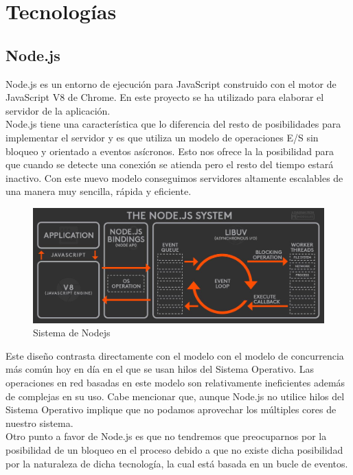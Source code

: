 \chapter{Tecnologías}

\section{Node.js}

Node.js es un entorno de ejecución para JavaScript construido con el motor de JavaScript
V8 de Chrome. En este proyecto se ha utilizado para elaborar el servidor de la aplicación.\\

Node.js tiene una característica que lo diferencia del resto de posibilidades para implementar 
el servidor y es que utiliza un modelo de operaciones E/S sin bloqueo y orientado a eventos 
asícronos. Esto nos ofrece la la posibilidad para que cuando se detecte una conexión se atienda
pero el resto del tiempo estará inactivo. Con este nuevo modelo conseguimos servidores altamente 
escalables de una manera muy sencilla, rápida y eficiente.\\

\begin{figure}[H]
	\centering
	\includegraphics[scale=0.25]{imagenes/nodejs_system.jpg}
	\caption{Sistema de Nodejs \label{fig:figura1}}
\end{figure}

Este diseño contrasta directamente con el modelo con el modelo de concurrencia más común hoy en 
día en el que se usan hilos del Sistema Operativo. Las operaciones en red basadas en este modelo
son relativamente ineficientes además de complejas en su uso. Cabe mencionar que, aunque Node.js 
no utilice hilos del Sistema Operativo implique que no podamos aprovechar los múltiples cores
de nuestro sistema.\\

Otro punto a favor de Node.js es que no tendremos que preocuparnos por la posibilidad de un 
bloqueo en el proceso debido a que no existe dicha posibilidad por la naturaleza de dicha 
tecnología, la cual está basada en un bucle de eventos.

